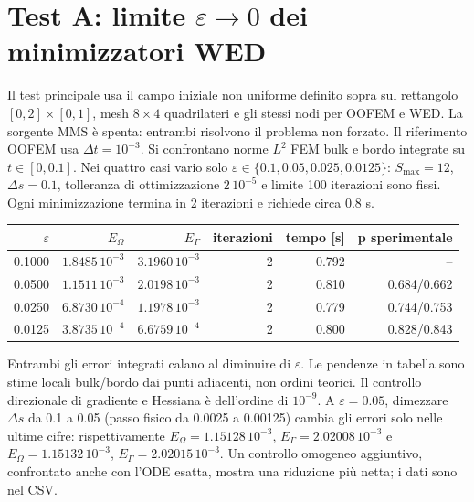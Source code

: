 \documentclass[10pt,a4paper]{article}
\begin{document}
\section{Test A: limite $\varepsilon\to0$ dei minimizzatori WED}
Il test principale usa il campo iniziale non uniforme definito sopra sul rettangolo $[0,2]\times[0,1]$, mesh $8\times4$ quadrilateri e gli stessi nodi per OOFEM e WED. La sorgente MMS è spenta: entrambi risolvono il problema non forzato. Il riferimento OOFEM usa $\Delta t=10^{-3}$. Si confrontano norme $L^2$ FEM bulk e bordo integrate su $t\in[0,0.1]$. Nei quattro casi vario solo $\varepsilon\in\{0.1,0.05,0.025,0.0125\}$: $S_{\max}=12$, $\Delta s=0.1$, tolleranza di ottimizzazione $2\,10^{-5}$ e limite 100 iterazioni sono fissi. Ogni minimizzazione termina in 2 iterazioni e richiede circa 0.8 s.
\begin{center}
\small
\begin{tabular}{rrrrrr}
\toprule
$\varepsilon$ & $E_\Omega$ & $E_\Gamma$ & iterazioni & tempo [s] & p sperimentale\\
\midrule
0.1000 & $1.8485\,10^{-3}$ & $3.1960\,10^{-3}$ & 2 & 0.792 & --\\
0.0500 & $1.1511\,10^{-3}$ & $2.0198\,10^{-3}$ & 2 & 0.810 & 0.684/0.662\\
0.0250 & $6.8730\,10^{-4}$ & $1.1978\,10^{-3}$ & 2 & 0.779 & 0.744/0.753\\
0.0125 & $3.8735\,10^{-4}$ & $6.6759\,10^{-4}$ & 2 & 0.800 & 0.828/0.843\\
\bottomrule
\end{tabular}
\end{center}
Entrambi gli errori integrati calano al diminuire di $\varepsilon$. Le pendenze in tabella sono stime locali bulk/bordo dai punti adiacenti, non ordini teorici. Il controllo direzionale di gradiente e Hessiana è dell'ordine di $10^{-9}$. A $\varepsilon=0.05$, dimezzare $\Delta s$ da 0.1 a 0.05 (passo fisico da 0.0025 a 0.00125) cambia gli errori solo nelle ultime cifre: rispettivamente $E_\Omega=1.15128\,10^{-3}$, $E_\Gamma=2.02008\,10^{-3}$ e $E_\Omega=1.15132\,10^{-3}$, $E_\Gamma=2.02015\,10^{-3}$. Un controllo omogeneo aggiuntivo, confrontato anche con l'ODE esatta, mostra una riduzione più netta; i dati sono nel CSV.
\end{document}

